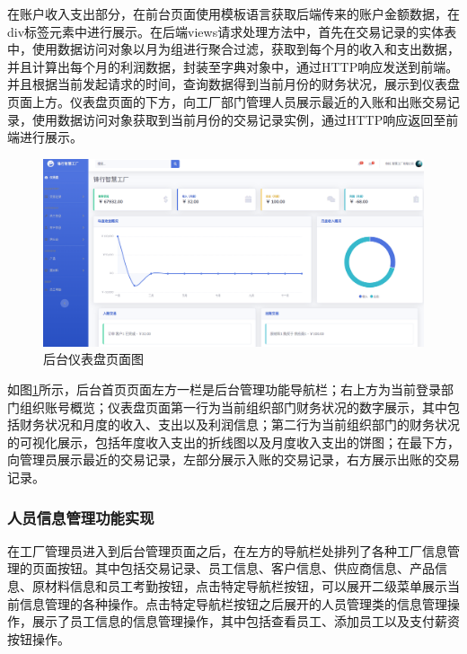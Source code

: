 在账户收入支出部分，在前台页面使用模板语言获取后端传来的账户金额数据，在div标签元素中进行展示。在后端views请求处理方法中，首先在交易记录的实体表中，使用数据访问对象以月为组进行聚合过滤，获取到每个月的收入和支出数据，并且计算出每个月的利润数据，封装至字典对象中，通过HTTP响应发送到前端。并且根据当前发起请求的时间，查询数据得到当前月份的财务状况，展示到仪表盘页面上方。仪表盘页面的下方，向工厂部门管理人员展示最近的入账和出账交易记录，使用数据访问对象获取到当前月份的交易记录实例，通过HTTP响应返回至前端进行展示。

\begin{figure}[H]
    \centering
    \includegraphics[width=.75\textwidth]{figures/5dashboard.png}
    \caption{后台仪表盘页面图}
    \label{fig:dashboard}
\end{figure}

如图\ref{fig:dashboard}所示，后台首页页面左方一栏是后台管理功能导航栏；右上方为当前登录部门组织账号概览；仪表盘页面第一行为当前组织部门财务状况的数字展示，其中包括财务状况和月度的收入、支出以及利润信息；第二行为当前组织部门的财务状况的可视化展示，包括年度收入支出的折线图以及月度收入支出的饼图；在最下方，向管理员展示最近的交易记录，左部分展示入账的交易记录，右方展示出账的交易记录。

\subsubsection{人员信息管理功能实现}

在工厂管理员进入到后台管理页面之后，在左方的导航栏处排列了各种工厂信息管理的页面按钮。其中包括交易记录、员工信息、客户信息、供应商信息、产品信息、原材料信息和员工考勤按钮，点击特定导航栏按钮，可以展开二级菜单展示当前信息管理的各种操作。点击特定导航栏按钮之后展开的人员管理类的信息管理操作，展示了员工信息的信息管理操作，其中包括查看员工、添加员工以及支付薪资按钮操作。

